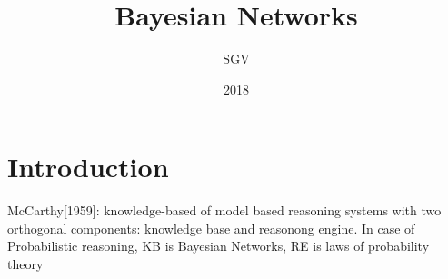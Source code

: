 \documentclass[12pt, specialist, subf, substylefile = ../philosophy/spbu.rtx]{disser}
\begin{document}
\institution{}

\title{Bayesian Networks}


\author{SGV}


\date{2018}

\maketitle


\tableofcontents


\chapter{Introduction}
McCarthy[1959]: knowledge-based of model based reasoning systems with two orthogonal components: knowledge base and reasonong engine.
In case of Probabilistic reasoning, KB is Bayesian Networks, RE is laws of probability theory
\end{document}
